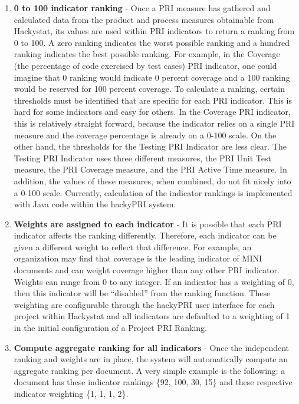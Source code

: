 \begin{enumerate}
\item \textbf{0 to 100 indicator ranking} - Once a PRI measure has gathered
  and calculated data from the product and process measures obtainable from
  Hackystat, its values are used within PRI indicators to return a ranking
  from 0 to 100. A zero ranking indicates the worst possible ranking and a
  hundred ranking indicates the best possible ranking. For example, in the
  Coverage (the percentage of code exercised by test cases) PRI indicator,
  one could imagine that 0 ranking would indicate 0 percent coverage and a
  100 ranking would be reserved for 100 percent coverage. To calculate a
  ranking, certain thresholds must be identified that are specific for each
  PRI indicator.  This is hard for some indicators and easy for others. In
  the Coverage PRI indicator, this is relatively straight forward, because
  the indicator relies on a single PRI measure and the coverage percentage
  is already on a 0-100 scale. On the other hand, the thresholds for the
  Testing PRI Indicator are less clear.  The Testing PRI Indicator uses
  three different measures, the PRI Unit Test measure, the PRI Coverage
  measure, and the PRI Active Time measure.  In addition, the values of
  these measures, when combined, do not fit nicely into a 0-100 scale.
  Currently, calculation of the indicator rankings is implemented with Java
  code within the hackyPRI system.
\item \textbf{Weights are assigned to each indicator} - It is possible that
  each PRI indicator affects the ranking differently. Therefore, each
  indicator can be given a different weight to reflect that difference. For
  example, an organization may find that coverage is the leading indicator
  of MINI documents and can weight coverage higher than any other PRI
  indicator.  Weights can range from 0 to any integer. If an indicator has
  a weighting of 0, then this indicator will be ``disabled'' from the
  ranking function.  These weighting are configurable through the hackyPRI
  user interface for each project within Hackystat and all indicators are
  defaulted to a weighting of 1 in the initial configuration of a Project
  PRI Ranking.
\item \textbf{Compute aggregate ranking for all indicators} - Once the
  independent ranking and weights are in place, the system will
  automatically compute an aggregate ranking per document. A very simple
  example is the following: a document has these indicator rankings \{92,
  100, 30, 15\} and these respective indicator weighting \{1, 1, 1, 2\}.

\end{enumerate}
